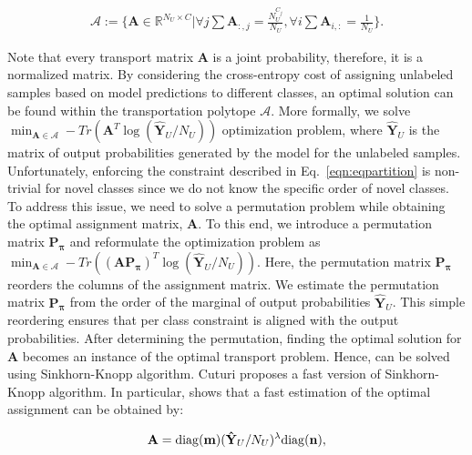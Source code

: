 \documentclass[runningheads]{eccv2022submission}
\begin{document}
\setlength{\abovedisplayskip}{-6pt}
\setlength{\belowdisplayskip}{2pt}
\setlength{\abovedisplayshortskip}{0pt}
\setlength{\belowdisplayshortskip}{0pt}

\begin{align}
   \mathcal{A} := \Big\{\mathbf{A}\in \mathbb{R}^{N_U\times C}|
   \forall j \sum \mathbf{A}_{:,j}=\frac{N_{U}^{C_j}}{N_U},
   \forall i \sum \mathbf{A}_{i,:}=\frac{1}{N_U}\Big\}.
\end{align}

Note that every transport matrix $\mathbf{A}$ is a joint probability, therefore, it is a normalized matrix. By considering the cross-entropy cost of assigning unlabeled samples based on model predictions to different classes, an optimal solution can be found within the transportation polytope $\mathcal{A}$. More formally, we solve $\min_{\mathbf{A}\in\mathcal{A}}-Tr(\mathbf{A}^T\log(\mathbf{\hat{Y}}_U/N_U))$ optimization problem, where $\mathbf{\hat{Y}}_U$ is the matrix of output probabilities generated by the model for the unlabeled samples. Unfortunately, enforcing the constraint described in Eq.~\ref{eqn:eqpartition} is non-trivial for novel classes since we do not know the specific order of novel classes. To address this issue, we need to solve a permutation problem while obtaining the optimal assignment matrix, $\mathbf{A}$. To this end, we introduce a permutation matrix $\mathbf{P_\pi}$ and reformulate the optimization problem as $\min_{\mathbf{A}\in\mathcal{A}}-Tr((\mathbf{A}\mathbf{P_\pi})^T\log(\mathbf{\hat{Y}}_U/N_U))$. Here, the permutation matrix $\mathbf{P_\pi}$ reorders the columns of the assignment matrix. We estimate the permutation matrix $\mathbf{P_\pi}$ from the order of the marginal of output probabilities $\mathbf{\hat{Y}}_U$. This simple reordering ensures that per class constraint is aligned with the output probabilities. After determining the permutation, finding the optimal solution for $\mathbf{A}$ becomes an instance of the optimal transport problem. Hence, can be solved using Sinkhorn-Knopp algorithm. Cuturi \cite{cuturi2013sinkhorn} proposes a fast version of Sinkhorn-Knopp algorithm. In particular, \cite{cuturi2013sinkhorn} shows that a fast estimation of the optimal assignment can be obtained by:

\setlength{\abovedisplayskip}{-10pt}
\setlength{\belowdisplayskip}{2pt}
\setlength{\abovedisplayshortskip}{0pt}
\setlength{\belowdisplayshortskip}{0pt}

\begin{align}
\label{eqn:sinkhon1}
   \mathbf{A} = \mathrm{diag}(\mathbf{m})(\mathbf{\Hat{Y}}_U/N_U)^{\lambda}\mathrm{diag}(\mathbf{n}),
\end{align}
\end{document}
